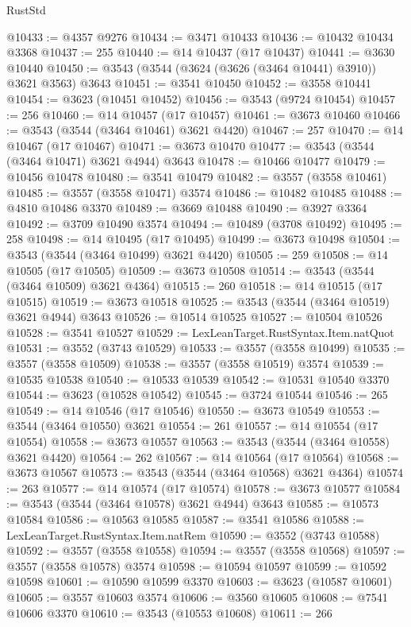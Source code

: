 \begin{lexlean}{RustStd}
\begin{coremodule}
@10433 := @4357 @9276
@10434 := @3471 @10433
@10436 := @10432 @10434 @3368
@10437 := 255
@10440 := @14 @10437 (@17 @10437)
@10441 := @3630 @10440
@10450 := @3543 (@3544 (@3624 (@3626 (@3464 @10441) @3910)) @3621 @3563) @3643
@10451 := @3541 @10450
@10452 := @3558 @10441
@10454 := @3623 (@10451 @10452)
@10456 := @3543 (@9724 @10454)
@10457 := 256
@10460 := @14 @10457 (@17 @10457)
@10461 := @3673 @10460
@10466 := @3543 (@3544 (@3464 @10461) @3621 @4420)
@10467 := 257
@10470 := @14 @10467 (@17 @10467)
@10471 := @3673 @10470
@10477 := @3543 (@3544 (@3464 @10471) @3621 @4944) @3643
@10478 := @10466 @10477
@10479 := @10456 @10478
@10480 := @3541 @10479
@10482 := @3557 (@3558 @10461)
@10485 := @3557 (@3558 @10471) @3574
@10486 := @10482 @10485
@10488 := @4810 @10486 @3370
@10489 := @3669 @10488
@10490 := @3927 @3364
@10492 := @3709 @10490 @3574
@10494 := @10489 (@3708 @10492)
@10495 := 258
@10498 := @14 @10495 (@17 @10495)
@10499 := @3673 @10498
@10504 := @3543 (@3544 (@3464 @10499) @3621 @4420)
@10505 := 259
@10508 := @14 @10505 (@17 @10505)
@10509 := @3673 @10508
@10514 := @3543 (@3544 (@3464 @10509) @3621 @4364)
@10515 := 260
@10518 := @14 @10515 (@17 @10515)
@10519 := @3673 @10518
@10525 := @3543 (@3544 (@3464 @10519) @3621 @4944) @3643
@10526 := @10514 @10525
@10527 := @10504 @10526
@10528 := @3541 @10527
@10529 := LexLeanTarget.RustSyntax.Item.natQuot
@10531 := @3552 (@3743 @10529)
@10533 := @3557 (@3558 @10499)
@10535 := @3557 (@3558 @10509)
@10538 := @3557 (@3558 @10519) @3574
@10539 := @10535 @10538
@10540 := @10533 @10539
@10542 := @10531 @10540 @3370
@10544 := @3623 (@10528 @10542)
@10545 := @3724 @10544
@10546 := 265
@10549 := @14 @10546 (@17 @10546)
@10550 := @3673 @10549
@10553 := @3544 (@3464 @10550) @3621
@10554 := 261
@10557 := @14 @10554 (@17 @10554)
@10558 := @3673 @10557
@10563 := @3543 (@3544 (@3464 @10558) @3621 @4420)
@10564 := 262
@10567 := @14 @10564 (@17 @10564)
@10568 := @3673 @10567
@10573 := @3543 (@3544 (@3464 @10568) @3621 @4364)
@10574 := 263
@10577 := @14 @10574 (@17 @10574)
@10578 := @3673 @10577
@10584 := @3543 (@3544 (@3464 @10578) @3621 @4944) @3643
@10585 := @10573 @10584
@10586 := @10563 @10585
@10587 := @3541 @10586
@10588 := LexLeanTarget.RustSyntax.Item.natRem
@10590 := @3552 (@3743 @10588)
@10592 := @3557 (@3558 @10558)
@10594 := @3557 (@3558 @10568)
@10597 := @3557 (@3558 @10578) @3574
@10598 := @10594 @10597
@10599 := @10592 @10598
@10601 := @10590 @10599 @3370
@10603 := @3623 (@10587 @10601)
@10605 := @3557 @10603 @3574
@10606 := @3560 @10605
@10608 := @7541 @10606 @3370
@10610 := @3543 (@10553 @10608)
@10611 := 266

\end{coremodule}
\end{lexlean}
